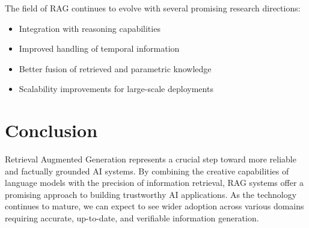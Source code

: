 \documentclass[]{article}
\begin{document}
The field of RAG continues to evolve with several promising research directions:
\begin{itemize}
    \item Integration with reasoning capabilities
    \item Improved handling of temporal information
    \item Better fusion of retrieved and parametric knowledge
    \item Scalability improvements for large-scale deployments
\end{itemize}

\section{Conclusion}

Retrieval Augmented Generation represents a crucial step toward more reliable and factually grounded AI systems. By combining the creative capabilities of language models with the precision of information retrieval, RAG systems offer a promising approach to building trustworthy AI applications. As the technology continues to mature, we can expect to see wider adoption across various domains requiring accurate, up-to-date, and verifiable information generation.
\end{document}
